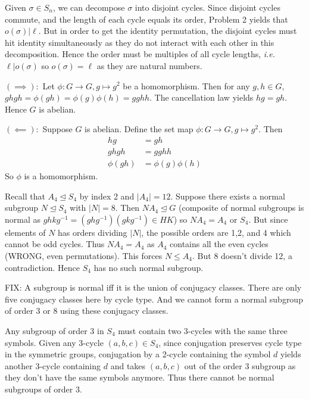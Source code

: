 \documentclass[12pt]{article}
\begin{document}
\begin{problem}[4]
Given $ \sigma \in S_n$, we can decompose $ \sigma$ into disjoint cycles. Since disjoint cycles commute, and the length of each cycle equals its order, Problem 2 yields that  $ o( \sigma) | \ell$. But in order to get the identity permutation, the disjoint cycles must hit identity simultaneously as they do not interact with each other in this decomposition. Hence the order must be multiples of all cycle lengths, \emph{i.e.} $ \ell| o( \sigma)$ so $ o( \sigma) = \ell$ as they are natural numbers.
\end{problem}

\begin{problem}[5]
	$ (\implies):$ Let $ \phi: G \to G, g \mapsto g^2$ be a homomorphism. Then for any $ g,h \in G$, $ ghgh = \phi(gh)= \phi(g)\phi(h) = gghh$. The cancellation law yields $ hg = gh$. Hence $ G$ is abelian.
	
	$ (\impliedby): $ Suppose $ G$ is abelian. Define the set map $ \phi:G \to G, g\mapsto g^2$. Then
	 \begin{align*}
	 	hg &= gh \\
		ghgh &= g g hh \\
		\phi(gh) &= \phi(g) \phi(h)
	 \end{align*}
	 So $ \phi$ is a homomorphism.
\end{problem}

\begin{problem}[6]
Recall that $ A_4 \trianglelefteq S_4$ by index 2 and $ |A_4|=12$. Suppose there exists a normal subgroup $ N \trianglelefteq S_4$ with $ |N|=8$. Then $ NA_4 \trianglelefteq G$ (composite of normal subgroups is normal as $ ghkg^{-1} = (ghg^{-1})(gkg^{-1}) \in HK$) so $ NA_4 = A_4$ or $ S_4$. But since elements of $ N$ has orders dividing  $ |N|$, the possible orders are 1,2, and 4 which cannot be odd cycles. Thus  $ NA_4 = A_4$ as $ A_4$ contains all the even cycles (WRONG, even permutations). This forces $ N \leq A_4$. But 8 doesn't divide 12, a contradiction. Hence $ S_4$ has no such normal subgroup.

FIX:
A subgroup is normal iff it is the union of conjugacy classes. There are only five conjugacy classes here by cycle type. And we cannot form a normal subgroup of order 3 or 8 using these conjugacy classes.

Any subgroup of order 3 in $ S_4$ must contain two 3-cycles with the same three symbols. Given any 3-cycle $ (a,b,c) \in S_4$, since conjugation preserves cycle type in the symmetric groups, conjugation by a 2-cycle containing the symbol $ d$ yields another 3-cycle containing $ d$ and takes  $ (a,b,c)$ out of the order 3 subgroup as they don't have the same symbols anymore. Thus there cannot be normal subgroups of order 3.
\end{problem}
\end{document}

